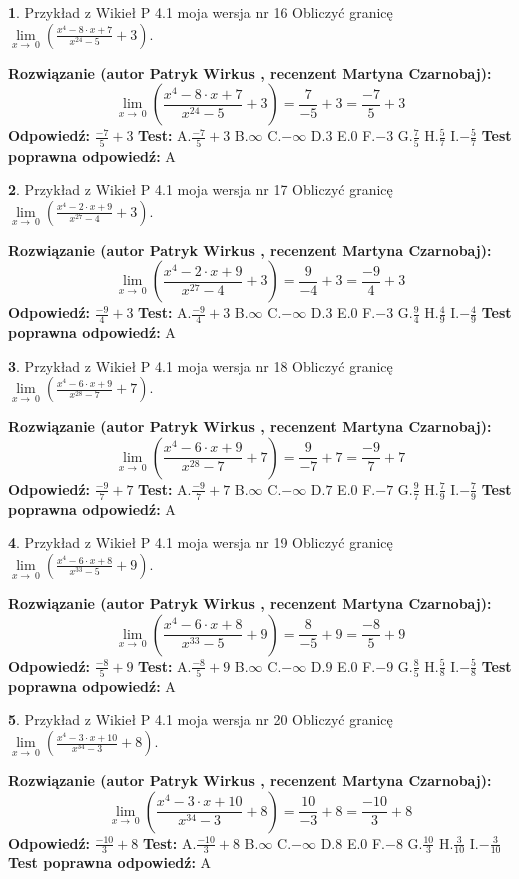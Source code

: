 \documentclass[12pt, a4paper]{article}
\theoremstyle{definition} %
\newtheorem{zad}{}
\newcommand{\zadStart}[1]{\begin{zad}#1\newline}
\newcommand{\zadStop}{\end{zad}}
\newcommand{\rozwStart}[2]{\noindent \textbf{Rozwiązanie (autor #1 , recenzent #2): }\newline}
\newcommand{\rozwStop}{\newline}
\newcommand{\odpStart}{\noindent \textbf{Odpowiedź:}\newline}
\newcommand{\odpStop}{\newline}
\newcommand{\testStart}{\noindent \textbf{Test:}\newline}
\newcommand{\testStop}{\newline}
\newcommand{\kluczStart}{\noindent \textbf{Test poprawna odpowiedź:}\newline}
\newcommand{\kluczStop}{\newline}
\begin{document}
\zadStart{Przykład z Wikieł P 4.1 moja wersja nr 16}
Obliczyć granicę $\lim\limits_{x\to\ 0}(\frac{x^{4}-8 \cdot x +7}{x^{24}-5}+3)$.
\zadStop
\rozwStart{Patryk Wirkus}{Martyna Czarnobaj}
$$\lim\limits_{x\to\ 0}(\frac{x^{4}-8 \cdot x +7}{x^{24}-5}+3)=\frac{7}{-5}+3=\frac{-7}{5}+3$$
\rozwStop
\odpStart
$\frac{-7}{5}+3$
\odpStop
\testStart
A.$\frac{-7}{5}+3$
B.$\infty$
C.$-\infty$
D.$3$
E.$0$
F.$-3$
G.$\frac{7}{5}$
H.$\frac{5}{7}$
I.$-\frac{5}{7}$
\testStop
\kluczStart
A
\kluczStop



\zadStart{Przykład z Wikieł P 4.1 moja wersja nr 17}
Obliczyć granicę $\lim\limits_{x\to\ 0}(\frac{x^{4}-2 \cdot x +9}{x^{27}-4}+3)$.
\zadStop
\rozwStart{Patryk Wirkus}{Martyna Czarnobaj}
$$\lim\limits_{x\to\ 0}(\frac{x^{4}-2 \cdot x +9}{x^{27}-4}+3)=\frac{9}{-4}+3=\frac{-9}{4}+3$$
\rozwStop
\odpStart
$\frac{-9}{4}+3$
\odpStop
\testStart
A.$\frac{-9}{4}+3$
B.$\infty$
C.$-\infty$
D.$3$
E.$0$
F.$-3$
G.$\frac{9}{4}$
H.$\frac{4}{9}$
I.$-\frac{4}{9}$
\testStop
\kluczStart
A
\kluczStop



\zadStart{Przykład z Wikieł P 4.1 moja wersja nr 18}
Obliczyć granicę $\lim\limits_{x\to\ 0}(\frac{x^{4}-6 \cdot x +9}{x^{28}-7}+7)$.
\zadStop
\rozwStart{Patryk Wirkus}{Martyna Czarnobaj}
$$\lim\limits_{x\to\ 0}(\frac{x^{4}-6 \cdot x +9}{x^{28}-7}+7)=\frac{9}{-7}+7=\frac{-9}{7}+7$$
\rozwStop
\odpStart
$\frac{-9}{7}+7$
\odpStop
\testStart
A.$\frac{-9}{7}+7$
B.$\infty$
C.$-\infty$
D.$7$
E.$0$
F.$-7$
G.$\frac{9}{7}$
H.$\frac{7}{9}$
I.$-\frac{7}{9}$
\testStop
\kluczStart
A
\kluczStop



\zadStart{Przykład z Wikieł P 4.1 moja wersja nr 19}
Obliczyć granicę $\lim\limits_{x\to\ 0}(\frac{x^{4}-6 \cdot x +8}{x^{33}-5}+9)$.
\zadStop
\rozwStart{Patryk Wirkus}{Martyna Czarnobaj}
$$\lim\limits_{x\to\ 0}(\frac{x^{4}-6 \cdot x +8}{x^{33}-5}+9)=\frac{8}{-5}+9=\frac{-8}{5}+9$$
\rozwStop
\odpStart
$\frac{-8}{5}+9$
\odpStop
\testStart
A.$\frac{-8}{5}+9$
B.$\infty$
C.$-\infty$
D.$9$
E.$0$
F.$-9$
G.$\frac{8}{5}$
H.$\frac{5}{8}$
I.$-\frac{5}{8}$
\testStop
\kluczStart
A
\kluczStop



\zadStart{Przykład z Wikieł P 4.1 moja wersja nr 20}
Obliczyć granicę $\lim\limits_{x\to\ 0}(\frac{x^{4}-3 \cdot x +10}{x^{34}-3}+8)$.
\zadStop
\rozwStart{Patryk Wirkus}{Martyna Czarnobaj}
$$\lim\limits_{x\to\ 0}(\frac{x^{4}-3 \cdot x +10}{x^{34}-3}+8)=\frac{10}{-3}+8=\frac{-10}{3}+8$$
\rozwStop
\odpStart
$\frac{-10}{3}+8$
\odpStop
\testStart
A.$\frac{-10}{3}+8$
B.$\infty$
C.$-\infty$
D.$8$
E.$0$
F.$-8$
G.$\frac{10}{3}$
H.$\frac{3}{10}$
I.$-\frac{3}{10}$
\testStop
\kluczStart
A
\kluczStop
\end{document}
